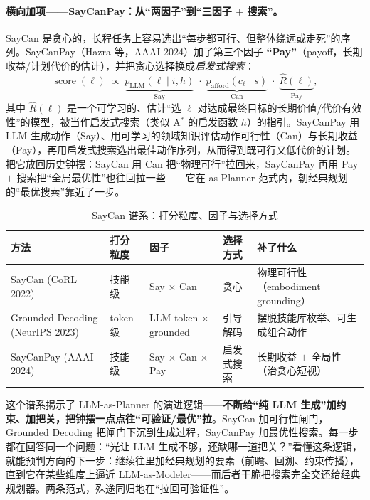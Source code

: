 \paragraph{横向加项——SayCanPay：从“两因子”到“三因子 $+$ 搜索”。}
SayCan 是贪心的，长程任务上容易选出“每步都可行、但整体绕远或走死”的序列。SayCanPay（Hazra 等，AAAI 2024）加了第三个因子 \textbf{“Pay”}（payoff，长期收益/计划代价的估计），并把贪心选择换成\emph{启发式搜索}：
\begin{equation}
  \operatorname{score}(\ell)
  \;\propto\;
  \underbrace{p_{\text{LLM}}(\ell\mid i,h)}_{\text{Say}}
  \;\cdot\;
  \underbrace{p_{\text{afford}}(c_\ell\mid s)}_{\text{Can}}
  \;\cdot\;
  \underbrace{\hat{R}(\ell)}_{\text{Pay}},
  \label{eq:saycanpay}
\end{equation}
其中 $\hat{R}(\ell)$ 是一个可学习的、估计“选 $\ell$ 对达成最终目标的长期价值/代价有效性”的模型，被当作启发式搜索（类似 A$^\ast$ 的启发函数 $h$）的指引。SayCanPay 用 LLM 生成动作（Say）、用可学习的领域知识评估动作可行性（Can）与长期收益（Pay），再用启发式搜索选出最佳动作序列，从而得到既可行又低代价的计划\cite{hazra2024saycanpay}。把它放回历史钟摆：SayCan 用 Can 把“物理可行”拉回来，SayCanPay 再用 Pay $+$ 搜索把“全局最优性”也往回拉一些——它在 as-Planner 范式内，朝经典规划的“最优搜索”靠近了一步。

\begin{table}[H]\centering\small
\caption{SayCan 谱系：打分粒度、因子与选择方式}
\label{tab:saycan-family}
\begin{tabular}{p{3.2cm}p{1.6cm}p{2.6cm}p{2.0cm}p{3.4cm}}
\toprule
方法 & 打分粒度 & 因子 & 选择方式 & 补了什么 \\
\midrule
SayCan (CoRL 2022) & 技能级 & Say $\times$ Can & 贪心 & 物理可行性（embodiment grounding） \\
Grounded Decoding (NeurIPS 2023) & token 级 & LLM token $\times$ grounded & 引导解码 & 摆脱技能库枚举、可生成组合动作 \\
SayCanPay (AAAI 2024) & 技能级 & Say $\times$ Can $\times$ Pay & 启发式搜索 & 长期收益 $+$ 全局性（治贪心短视） \\
\bottomrule
\end{tabular}
\end{table}

\begin{insight}
这个谱系揭示了 LLM-as-Planner 的演进逻辑——\textbf{不断给“纯 LLM 生成”加约束、加把关，把钟摆一点点往“可验证/最优”拉}。SayCan 加可行性闸门，Grounded Decoding 把闸门下沉到生成过程，SayCanPay 加最优性搜索。每一步都在回答同一个问题：“光让 LLM 生成不够，还缺哪一道把关？”看懂这条逻辑，就能预判方向的下一步：继续往里加经典规划的要素（前瞻、回溯、约束传播），直到它在某些维度上逼近 LLM-as-Modeler——而后者干脆把搜索完全交还给经典规划器。两条范式，殊途同归地在“拉回可验证性”。
\end{insight}

